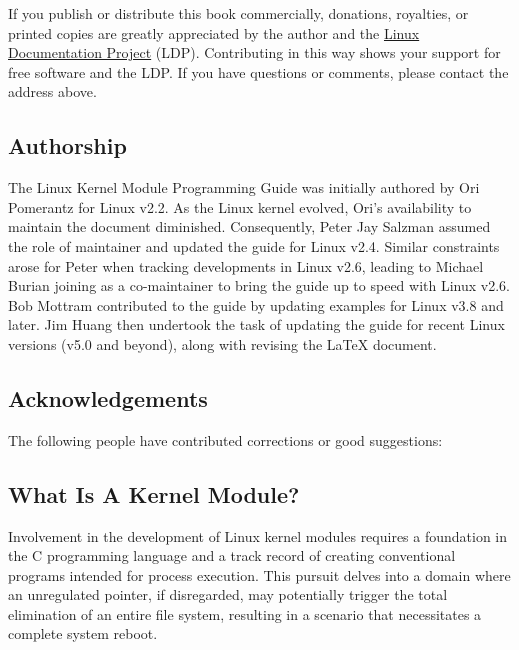 \documentclass[10pt, oneside]{book}
\begin{document}
If you publish or distribute this book commercially, donations, royalties, or printed copies are greatly appreciated by the author and the \href{https://tldp.org/}{Linux Documentation Project} (LDP).
Contributing in this way shows your support for free software and the LDP. If you have questions or comments, please contact the address above.

\subsection{Authorship}
\label{sec:authorship}

The Linux Kernel Module Programming Guide was initially authored by Ori Pomerantz for Linux v2.2.
As the Linux kernel evolved, Ori's availability to maintain the document diminished.
Consequently, Peter Jay Salzman assumed the role of maintainer and updated the guide for Linux v2.4.
Similar constraints arose for Peter when tracking developments in Linux v2.6,
leading to Michael Burian joining as a co-maintainer to bring the guide up to speed with Linux v2.6.
Bob Mottram contributed to the guide by updating examples for Linux v3.8 and later.
Jim Huang then undertook the task of updating the guide for recent Linux versions (v5.0 and beyond),
along with revising the LaTeX document.

\subsection{Acknowledgements}
\label{sec:acknowledgements}

The following people have contributed corrections or good suggestions: 

\begin{flushleft}

\end{flushleft}

\subsection{What Is A Kernel Module?}
\label{sec:kernelmod}

Involvement in the development of Linux kernel modules requires a foundation in the C programming language and a track record of creating conventional programs intended for process execution.
This pursuit delves into a domain where an unregulated pointer, if disregarded,
may potentially trigger the total elimination of an entire file system,
resulting in a scenario that necessitates a complete system reboot.
\end{document}
